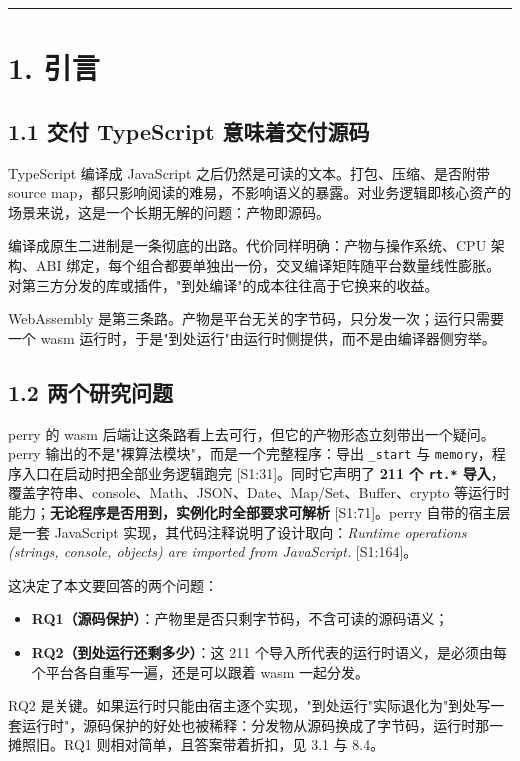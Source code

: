 \documentclass[11pt, a4paper]{article}
\begin{document}
\bigskip\hrule\bigskip

\section{1. 引言}

\subsection{1.1 交付 TypeScript 意味着交付源码}

TypeScript 编译成 JavaScript 之后仍然是可读的文本。打包、压缩、是否附带 source map，都只影响阅读的难易，不影响语义的暴露。对业务逻辑即核心资产的场景来说，这是一个长期无解的问题：产物即源码。


编译成原生二进制是一条彻底的出路。代价同样明确：产物与操作系统、CPU 架构、ABI 绑定，每个组合都要单独出一份，交叉编译矩阵随平台数量线性膨胀。对第三方分发的库或插件，"到处编译"的成本往往高于它换来的收益。


WebAssembly 是第三条路。产物是平台无关的字节码，只分发一次；运行只需要一个 wasm 运行时，于是"到处运行"由运行时侧提供，而不是由编译器侧穷举。


\subsection{1.2 两个研究问题}

perry 的 wasm 后端让这条路看上去可行，但它的产物形态立刻带出一个疑问。perry 输出的不是"裸算法模块"，而是一个完整程序：导出 \texttt{\_start} 与 \texttt{memory}，程序入口在启动时把全部业务逻辑跑完 [S1:31]。同时它声明了 \textbf{211 个 \texttt{rt.*} 导入}，覆盖字符串、console、Math、JSON、Date、Map/Set、Buffer、crypto 等运行时能力；\textbf{无论程序是否用到，实例化时全部要求可解析} [S1:71]。perry 自带的宿主层是一套 JavaScript 实现，其代码注释说明了设计取向：\emph{Runtime operations (strings, console, objects) are imported from JavaScript.} [S1:164]。


这决定了本文要回答的两个问题：


\begin{itemize}
\item \textbf{RQ1（源码保护）}：产物里是否只剩字节码，不含可读的源码语义；
\item \textbf{RQ2（到处运行还剩多少）}：这 211 个导入所代表的运行时语义，是必须由每个平台各自重写一遍，还是可以跟着 wasm 一起分发。
\end{itemize}

RQ2 是关键。如果运行时只能由宿主逐个实现，"到处运行"实际退化为"到处写一套运行时"，源码保护的好处也被稀释：分发物从源码换成了字节码，运行时那一摊照旧。RQ1 则相对简单，且答案带着折扣，见 3.1 与 8.4。
\end{document}

